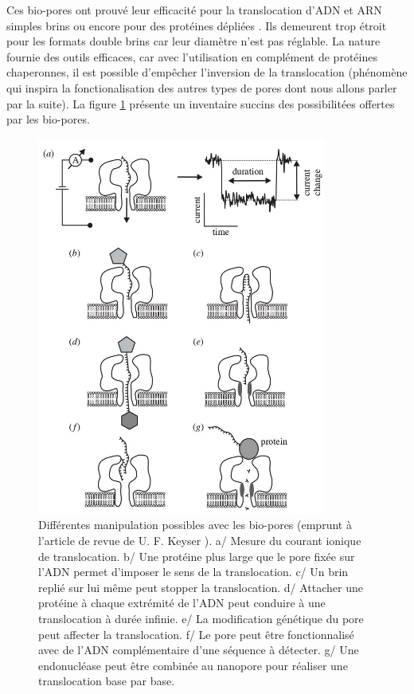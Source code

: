Ces bio-pores ont prouvé leur efficacité pour la translocation d'ADN et ARN simples brins ou encore pour des protéines dépliées \cite{Movileanu2005}. Ils demeurent trop étroit pour les formats double brins car leur diamètre n'est pas réglable. La nature fournie des outils efficaces, car avec l'utilisation en complément de protéines chaperonnes, il est possible d’empêcher l'inversion de la translocation \cite{DeLosRios2006} (phénomène qui inspira la fonctionalisation des autres types de pores dont nous allons parler par la suite). La figure \ref{bioporepossib} présente un inventaire succins des possibilitées offertes par les bio-pores. 
\begin{figure}[H]
\begin{center}
\includegraphics[width=0.85\textwidth]{bionanopore.jpg}


\caption[Manipulations sur bio-pores]{Différentes manipulation possibles avec les bio-pores (emprunt à l'article de revue de U. F. Keyser \cite{keyser}). a/ Mesure du courant ionique de translocation. b/ Une protéine plus large que le pore fixée sur l'ADN permet d'imposer le sens de la translocation. c/ Un brin replié sur lui même peut stopper la translocation. d/ Attacher une protéine à chaque extrémité de l'ADN peut conduire à une translocation à durée infinie. e/ La modification génétique du pore peut affecter la translocation. f/ Le pore peut être fonctionnalisé avec de l'ADN complémentaire d'une séquence à détecter. g/ Une endonucléase peut être combinée au nanopore pour réaliser une translocation base par base.}
\label{bioporepossib}
\end{center}
\end{figure}

